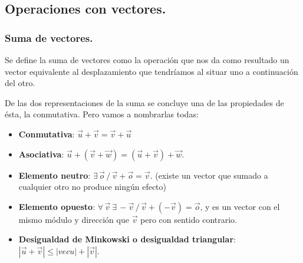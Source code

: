 \documentclass[a4paper,11pt,answers]{exam}
\begin{document}
\subsection{Operaciones con vectores.}
\subsubsection{Suma de vectores.}
Se define la suma de vectores como la operación que nos da como resultado un vector equivalente al desplazamiento que tendríamos al situar uno a continuación del otro.\\
\begin{center}
\begin{multicols}{2}

\end{multicols}
\end{center}

De las dos representaciones de la suma se concluye una de las propiedades de ésta, la conmutativa. Pero vamos a nombrarlas todas:
\begin{itemize}
	\item \textbf{Conmutativa}: $\vec u + \vec v = \vec v + \vec u$
	\item \textbf{Asociativa}: $\vec u + (\vec v + \vec w) = (\vec u + \vec v) + \vec w$.
	\item \textbf{Elemento neutro}: $\exists\, \vec{o}\,/\,\vec{v} + \vec{o} = \vec{v}$. (existe un vector que sumado a cualquier otro no produce ningún efecto)
	\item \textbf{Elemento opuesto}: $\forall\,\vec v\ \exists\, -\vec v\,/\,\vec v + (-\vec v) = \vec o$, y es un vector con el mismo módulo y dirección que $\vec v$ pero con sentido contrario.
	\item \textbf{Desigualdad de Minkowski o desigualdad triangular}: $\left|\vec u + \vec v\right| \leq \left|vec u\right| + \left|\vec v\right|$.
\end{itemize}
\end{document}
